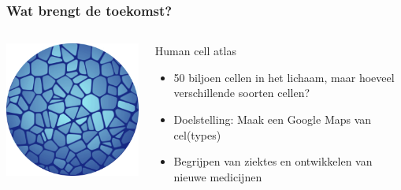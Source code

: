 \documentclass{beamer}
\begin{document}
\begin{frame}
	\frametitle{Wat brengt de toekomst?}
		\begin{columns}
		\begin{column}{0.3\textwidth}
			\includegraphics[width=\linewidth]{figures/9_future/hca.png}
		\end{column}
		\begin{column}{0.7\textwidth}
			Human cell atlas
			\begin{itemize}
				\item<2-> 50 biljoen cellen in het lichaam, maar hoeveel verschillende soorten cellen?
				\item<3-> Doelstelling: Maak een Google Maps van cel(types)
				\item<4-> Begrijpen van ziektes en ontwikkelen van nieuwe medicijnen
			\end{itemize}
		\end{column}
	\end{columns}

\end{frame}
\end{document}
